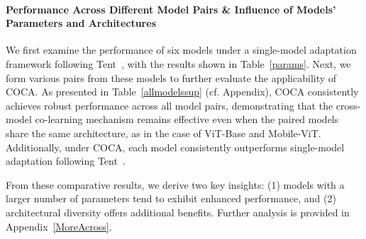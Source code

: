




\paragraph{Performance Across Different Model Pairs \& Influence of Models' Parameters and Architectures} We first examine the performance of six models under a single-model adaptation framework following Tent~\cite{wang2020tent}, with the results shown in Table~\ref{params}. Next, we form various pairs from these models to further evaluate the applicability of COCA. As presented in Table~\ref{allmodelssup} (cf. Appendix), COCA consistently achieves robust performance across all model pairs, demonstrating that the cross-model co-learning mechanism remains effective even when the paired models share the same architecture, as in the case of ViT-Base and Mobile-ViT. Additionally, under COCA, each model consistently outperforms single-model adaptation following Tent~\cite{wang2020tent}.

From these comparative results, we derive two key insights: (1) models with a larger number of parameters tend to exhibit enhanced performance, and (2) architectural diversity offers additional benefits. Further analysis is provided in Appendix~\ref{MoreAcross}.



